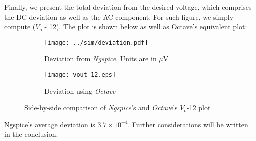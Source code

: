 Finally, we present the total deviation from the desired voltage, which comprises the DC deviation as well as the AC component. For such figure, we simply compute ($V_o$ - 12). The plot is shown below as well as Octave's equivalent plot:
\begin{figure}[H]
\centering
\begin{subfigure}{.5\textwidth}
  \centering
  \texttt{[image: ../sim/deviation.pdf]}
  \caption{Deviation from \textit{Ngspice}. Units are in $\mu$V}
  \label{fig:DeviationNGSPICE}
\end{subfigure}%
\begin{subfigure}{.5\textwidth}
  \centering
  \texttt{[image: vout\_12.eps]}
  \caption{Deviation using \textit{Octave}}
  \label{fig:DeviationOCTAVE}
\end{subfigure}
\caption{Side-by-side comparison of \textit{Ngspice}'s and \textit{Octave}'s $V_o$-12 plot}
\label{fig:RegulatorComparacao}
\end{figure}

Ngspice's average deviation is $3.7 \times 10^{-4}$.
Further considerations will be written in the conclusion.
